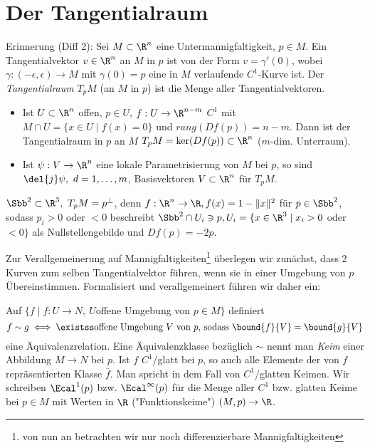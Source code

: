\chapter{Der Tangentialraum}\lecture

Erinnerung (Diff 2): Sei $ M \subset \R^n $ eine Untermannigfaltigkeit, $p \in M$. Ein Tangentialvektor $v \in \R^n$ an $M$ in $p$ ist von der Form $ v = \gamma'(0) $, wobei $ \gamma: (-\epsilon,\epsilon) \to M $ mit $\gamma(0) = p$ eine in $M$ verlaufende $C^1$-Kurve ist. Der \emph{Tangentialraum} $T_pM$ (an $M$ in $p$) ist die Menge aller Tangentialvektoren. 
\begin{itemize}
	\item Ist $ U \subset \R^n $ offen, $p \in U$, $f: U \to \R^{n-m}$ $C^1$ mit $ M \cap U = \{x \in U \mid f(x) = 0\} $ und $rang(Df(p)) = n-m.$ Dann ist der Tangentialraum in $p$ an $M$ $ T_pM = \ker(Df(p)) \subset \R^n $ ($m$-dim. Unterraum).
	\item Ist $ \psi: V \to \R^n $ eine lokale Parametrisierung von $M$ bei $p$, so sind $ \del{j}\psi,\ d=1,\dotsc,m$, Basisvektoren $ V \subset \R^n $ für $ T_pM $.
\end{itemize}

\begin{exmp*}
	$ \Sbb^2 \subset \R^3,\ T_pM = p^\bot $, denn $ f: \R^n \to \R, f(x) = 1-\|x\|^2 $ für $ p \in \Sbb^2 $, sodass $p_i > 0$ oder $<0$ beschreibt $ \Sbb^2 \cap U_i \ni p, U_i = \{x \in \R^3 \mid x_i > 0 $ oder $ < 0\} $ als Nullstellengebilde und $ Df(p) = -2p. $
\end{exmp*}

Zur Verallgemeinerung auf Mannigfaltigkeiten\footnote{von nun an betrachten wir nur noch differenzierbare Mannigfaltigkeiten} überlegen wir zunächst, dass 2 Kurven zum selben Tangentialvektor führen, wenn sie in einer Umgebung von $p$ Übereinstimmen. Formalisiert und verallgemeinert führen wir daher ein:

\begin{defn}[Keime]
	Auf $ \{f \mid f: U \to N,\ U $offene Umgebung von $p \in M\} $ definiert 
	$$ f \sim g \iff \existss \text{offene Umgebung } V \ \text{von } p \text{, sodass } \bound{f}{V} = \bound{g}{V} $$
	eine Äquivalenzrelation. Eine Äquivalenzklasse bezüglich $\sim$ nennt man \emph{Keim} einer Abbildung $M \to N$ bei $p$. Ist $ f $ $C^1$/glatt bei $p$, so auch alle Elemente der von $f$ repräsentierten Klasse $\bar{f}$. Man spricht in dem Fall von $C^1$/glatten Keimen. Wir schreiben $ \Ecal^1(p) $ bzw. $\Ecal^\infty(p)$ für die Menge aller $C^1$ bzw. glatten Keime bei $p \in M$ mit Werten in $\R$ ("Funktionskeime") $ (M,p) \to \R $.
\end{defn}

